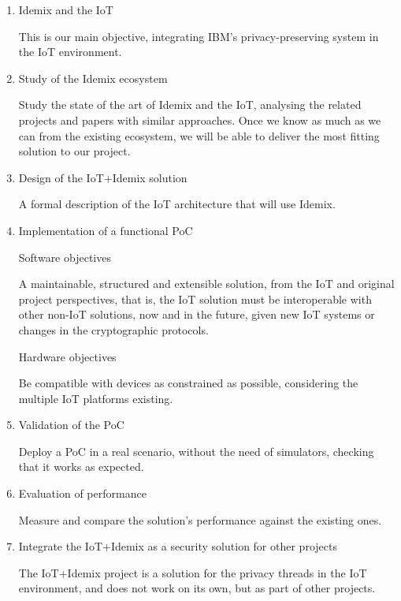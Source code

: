 \begin{enumerate}
	\item Idemix and the IoT
	
	This is our main objective, integrating IBM's privacy-preserving system in the IoT environment.
	
	\item Study of the Idemix ecosystem
	
	Study the state of the art of Idemix and the IoT, analysing the related projects and papers with similar approaches. Once we know as much as we can from the existing ecosystem, we will be able to deliver the most fitting solution to our project.
	
	\item Design of the IoT+Idemix solution
	
	A formal description of the IoT architecture that will use Idemix.
	
	
	\item Implementation of a functional PoC
	
	\subitem Software objectives
	
	A maintainable, structured and extensible solution, from the IoT and original project perspectives, that is, the IoT solution must be interoperable with other non-IoT solutions, now and in the future, given new IoT systems or changes in the cryptographic protocols.
	
	\subitem Hardware objectives
	
	Be compatible with devices as constrained as possible, considering the multiple IoT platforms existing.
	
	
	\item Validation of the PoC
	
	Deploy a \ac{PoC} in a real scenario, without the need of simulators, checking that it works as expected.
	
	\item Evaluation of performance
	
	Measure and compare the solution's performance against the existing ones.
	
	\item Integrate the IoT+Idemix as a security solution for other projects
	
	The IoT+Idemix project is a solution for the privacy threads in the IoT environment, and does not work on its own, but as part of other projects.
	
\end{enumerate}





